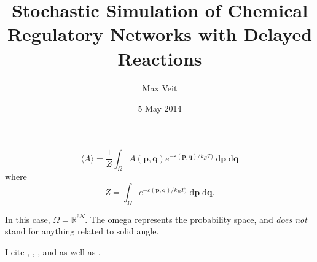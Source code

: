 \documentclass[english,letterpaper,12pt]{article}
\newcommand{\dee}{\;\mathrm{d}}
\renewcommand{\vec}[1]{\ensuremath{\mathbf{#1}}}
\begin{document}
\title{Stochastic Simulation of Chemical Regulatory Networks with Delayed Reactions}
\author{Max Veit}
\date{5 May 2014}

\maketitle

\begin{doublespacing}

\lipsum[1-2]

\begin{equation}
    \langle A \rangle = \frac{1}{Z} \int_\Omega A(\vec{p}, \vec{q}) e^{-\varepsilon(\vec{p}, \vec{q}) / k_B T)} \dee \vec{p} \dee \vec{q}
\end{equation}
where
\begin{equation}
    Z = \int_\Omega e^{-\varepsilon(\vec{p}, \vec{q}) / k_B T)}\dee \vec{p} \dee \vec{q}.
\end{equation}

In this case, $\Omega = \mathbb{R}^{6N}$. The omega represents the probability space, and \emph{does not} stand for anything related to solid angle.

I cite \cite{bistable-modeling}, \cite{we-exact}, \cite{we-chemkin}, and \cite{delay-oscillations} as well as \cite{gillespie-ssa}.

\lipsum[3-4]

\end{doublespacing}



\end{document}
